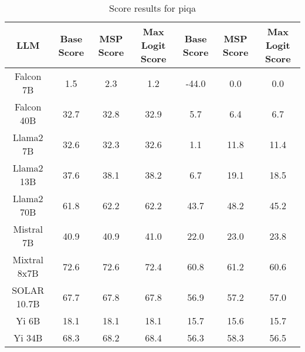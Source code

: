 \renewcommand\arraystretch{1.2}
\begin{table*}
\centering
\begin{tabular}{c|c|c|c|c|c|c}
LLM & Base Score & MSP Score & Max Logit Score & Base Score & MSP Score & Max Logit Score\\ \hline
Falcon 7B & 1.5 & 2.3 & 1.2 & -44.0 & 0.0 & 0.0\\
Falcon 40B & 32.7 & 32.8 & 32.9 & 5.7 & 6.4 & 6.7\\
Llama2 7B & 32.6 & 32.3 & 32.6 & 1.1 & 11.8 & 11.4\\
Llama2 13B & 37.6 & 38.1 & 38.2 & 6.7 & 19.1 & 18.5\\
Llama2 70B & 61.8 & 62.2 & 62.2 & 43.7 & 48.2 & 45.2\\
Mistral 7B & 40.9 & 40.9 & 41.0 & 22.0 & 23.0 & 23.8\\
Mixtral 8x7B & 72.6 & 72.6 & 72.4 & 60.8 & 61.2 & 60.6\\
SOLAR 10.7B & 67.7 & 67.8 & 67.8 & 56.9 & 57.2 & 57.0\\
Yi 6B & 18.1 & 18.1 & 18.1 & 15.7 & 15.6 & 15.7\\
Yi 34B & 68.3 & 68.2 & 68.4 & 56.3 & 58.3 & 56.5\\
\hline
\end{tabular}
\caption{Score results for piqa}
\end{table*}
\label{tab:piqa_score}
